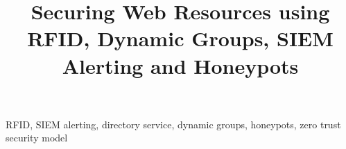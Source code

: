 \documentclass[conference]{IEEEtran}
\begin{document}
\title{Securing Web Resources using RFID, Dynamic Groups, SIEM
  Alerting and Honeypots}


\maketitle

\begin{abstract}
  
\end{abstract}

\begin{IEEEkeywords}
  RFID,
  SIEM alerting,
  directory service,
  dynamic groups,
  honeypots,
  zero trust security model
\end{IEEEkeywords}













\end{document}
